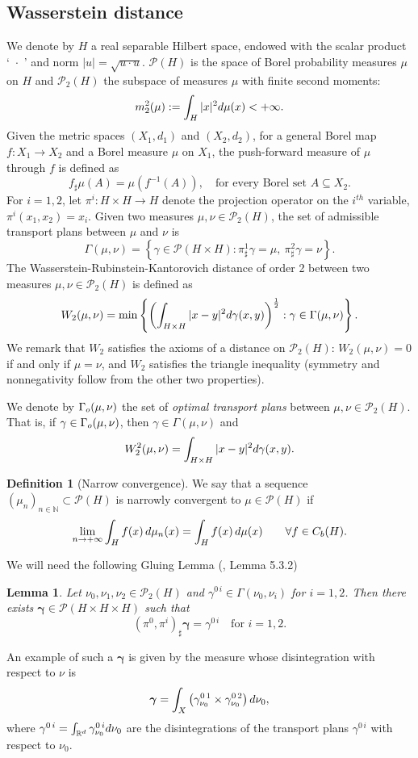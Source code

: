 \documentclass[12pt,a4paper]{article}
\newcommand{\N}{\mathbb{N}}
\newcommand{\R}{\mathbb{R}}
\renewcommand{\P}{\mathcal{P}}
\renewcommand{\d}{{\rm d}}
\newcommand{\g}{\boldsymbol{\gamma}}
\newcommand{\X}{\mathcal{P}_2(H)}
\theoremstyle{plain}
\newtheorem{lemma}[theorem]{Lemma}
\theoremstyle{definition}
\newtheorem{definition}[theorem]{Definition}
\begin{document}
\subsection{Wasserstein distance} We denote by  $H$ a real separable Hilbert space, endowed with the scalar product `\ $\cdot$\ ' and norm $|u|=\sqrt{u\cdot u}$. $\P(H)$ is the space of Borel probability measures $\mu$ on $H$ and $\X$ the subspace of measures $\mu$  with finite second moments: 
\begin{equation}
\label{def:m2}
	m_2^2(\mu):=\int_H |x|^2\d\mu(x) <+\infty.
\end{equation}
Given the metric spaces $(X_1,d_1)$ and $(X_2,d_2)$, for a general Borel map $f:X_1 \to X_2$ and a Borel measure $\mu$ on $X_1$, the push-forward measure of $\mu$ through $f$ is defined as
\[
	f_\sharp \mu (A) = \mu(f^{-1}(A)),\quad \text{for every Borel set }A\subseteq X_2.
\]
For $i=1,2$, let $\pi^i:H \times H \to H$ denote the projection operator on the $i^{th}$ variable, $\pi^i(x_1,x_2)=x_i$. Given two measures $\mu,\nu \in \X$, the set of admissible transport plans between $\mu$  and $\nu$ is
\[
	\Gamma(\mu,\nu)=\left\{ \gamma \in \P(H \times H) : \pi^1_\sharp \gamma = \mu,\ \pi^2_\sharp \gamma = \nu\right\}.
\]
The Wasserstein-Rubinstein-Kantorovich distance of order 2 between two measures $\mu,\nu \in \X$ is defined as
\[
	W_2(\mu,\nu) = \min\left\{ \left( \int_{H \times H} |x-y|^2 \d\gamma(x,y)\right)^{\frac12}  : \gamma \in \Gamma(\mu,\nu)\right\}.
\]
We remark that $W_2$ satisfies the axioms of a distance on $\X$: $W_2(\mu,\nu)=0$ if and only if $\mu=\nu$, and $W_2$ satisfies the triangle inequality (symmetry and nonnegativity follow from the other two properties).

We denote by $\Gamma_{\rm o}(\mu,\nu)$ the set of \emph{optimal transport plans} between $\mu,\nu\in \X$. That is, if $\gamma \in \Gamma_{\rm o}(\mu,\nu)$, then $\gamma \in \Gamma(\mu,\nu)$ and 
\[
	W_2^2(\mu,\nu)= \int_{H \times H}|x-y|^2\d\gamma(x,y).
\]
\begin{definition}[Narrow convergence]
We say that a sequence $(\mu_n)_{n\in \N} \subset \P(H)$ is narrowly convergent to $\mu \in \P(H)$ if
\[
	\lim_{n\to +\infty} \int_{H}f(x)\,\d\mu_n(x) = \int_{H}f(x)\,\d\mu(x)\qquad \forall f \in C_b(H).
\]
\end{definition}
We will need the following Gluing Lemma (\cite{ambrosio-gigli-savare}, Lemma 5.3.2)
\begin{lemma}
\label{lemma:glue}
Let $\nu_0,\nu_1,\nu_2\in \X$ and $\gamma^{0\, i}\in \Gamma(\nu_0,\nu_i)$ for $i=1,2$. Then there exists $\g \in \P\left( H \times H \times H\right)$ such that
\[
	(\pi^0,\pi^i)_\sharp \g =\gamma^{0\, i} \quad \text{for } i=1,2. 
\]
\end{lemma}
An example of such a $\g$ is given by the measure whose disintegration with respect to $\nu$ is 
\[
	\g = \int_{X} \left(\gamma_{\nu_0}^{0\,1}\times \gamma_{\nu_0}^{0\,2}\right) \d\nu_0,
\] 
where $	\gamma^{0\, i} = \int_{\R^d}\gamma^{0\, i}_{\nu_0}\d\nu_0$ are the disintegrations of the transport plans $\gamma^{0\, i}$ with respect to $\nu_0$.
\end{document}
